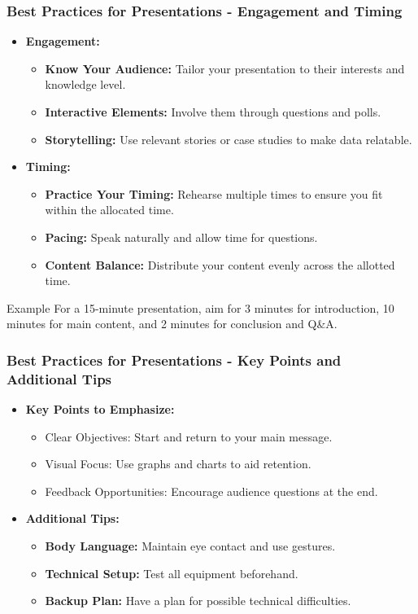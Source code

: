 \documentclass[aspectratio=169]{beamer}
\begin{document}
\begin{frame}[fragile]
    \frametitle{Best Practices for Presentations - Engagement and Timing}
    \begin{itemize}
        \item \textbf{Engagement:}
        \begin{itemize}
            \item \textbf{Know Your Audience:} Tailor your presentation to their interests and knowledge level.
            \item \textbf{Interactive Elements:} Involve them through questions and polls.
            \item \textbf{Storytelling:} Use relevant stories or case studies to make data relatable.
        \end{itemize}
        \item \textbf{Timing:}
        \begin{itemize}
            \item \textbf{Practice Your Timing:} Rehearse multiple times to ensure you fit within the allocated time.
            \item \textbf{Pacing:} Speak naturally and allow time for questions.
            \item \textbf{Content Balance:} Distribute your content evenly across the allotted time.
        \end{itemize}
    \end{itemize}
    \begin{block}{Example}
        For a 15-minute presentation, aim for 3 minutes for introduction, 10 minutes for main content, and 2 minutes for conclusion and Q\&A.
    \end{block}
\end{frame}

\begin{frame}[fragile]
    \frametitle{Best Practices for Presentations - Key Points and Additional Tips}
    \begin{itemize}
        \item \textbf{Key Points to Emphasize:}
        \begin{itemize}
            \item Clear Objectives: Start and return to your main message.
            \item Visual Focus: Use graphs and charts to aid retention.
            \item Feedback Opportunities: Encourage audience questions at the end.
        \end{itemize}
        \item \textbf{Additional Tips:}
        \begin{itemize}
            \item \textbf{Body Language:} Maintain eye contact and use gestures.
            \item \textbf{Technical Setup:} Test all equipment beforehand.
            \item \textbf{Backup Plan:} Have a plan for possible technical difficulties.
        \end{itemize}
    \end{itemize}
\end{frame}
\end{document}
